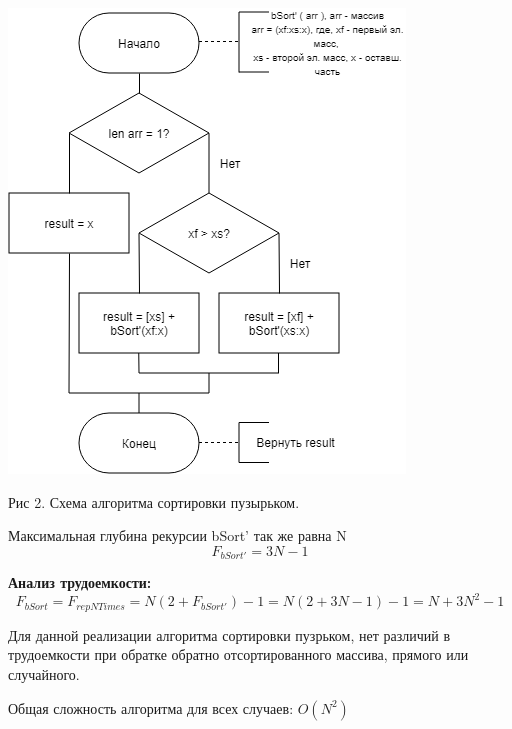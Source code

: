 \documentclass[12pt]{report}
\begin{document}
\begin{minipage}{0.5\textwidth}
  \begin{flushleft}
	\includegraphics[scale=0.6]{bSort2.png}

	Рис 2. Схема алгоритма сортировки пузырьком.
  \end{flushleft}
\end{minipage}
\hfill
\begin{minipage}{0.5\textwidth}
  \begin{flushright}
	\begin{center}
		Максимальная глубина рекурсии bSort' так же равна N
		\begin{equation}
		F_{bSort'} = 3N - 1
		\end{equation}
	\end{center}
  \end{flushright}
\end{minipage}

\begin{center}
\textbf{Анализ трудоемкости:}
\begin{equation}
	F_{bSort} = F_{repNTimes} = N(2 + F_{bSort'}) - 1 = N(2 + 3N - 1) - 1 = N + 3N^2 - 1
\end{equation}

Для данной реализации алгоритма сортировки пузрьком, нет различий в трудоемкости при обратке обратно отсортированного массива, прямого или случайного.

Общая сложность алгоритма для всех случаев: {$O(N^2)$}
\end{center}
\end{document}
